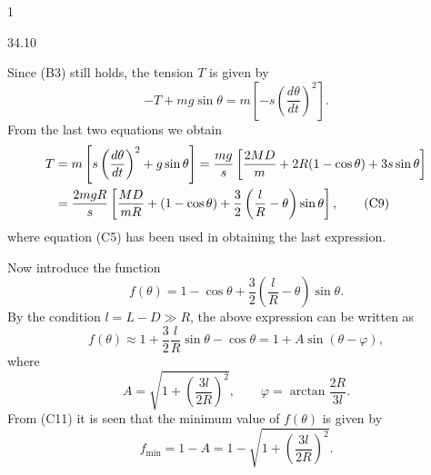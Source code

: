 \begin{solution}{1}
\begin{figbox}{34.10}
\end{figbox}

Since (B3) still holds, the tension $T$ is given by
\begin{equation}
-T+mg\sin\theta=m\left[-s\left(\frac{d\theta}{dt}\right)^2\right]. \tag{C8}
\end{equation}
From the last two equations we obtain
\begin{align}
T&=m\left[s\left(\frac{d\theta}{dt}\right)^2+g\sin\theta\right]
=\frac{mg}{s}\left[\frac{2MD}{m}+2R(1-\cos\theta)+3s\sin\theta\right]\notag\\
&=\frac{2mgR}{s}\left[\frac{MD}{mR}+(1-\cos\theta)+\frac{3}{2}\left(\frac{l}{R}-\theta\right)\sin\theta\right], \tag{C9}
\end{align}
where equation (C5) has been used in obtaining the last expression.

Now introduce the function
\begin{equation}
f(\theta)=1-\cos\theta+\frac{3}{2}\left(\frac{l}{R}-\theta\right)\sin\theta . \tag{C10}
\end{equation}
By the condition $l=L-D\gg R$, the above expression can be written as
\begin{equation}
f(\theta)\approx 1+\frac{3}{2}\frac{l}{R}\sin\theta-\cos\theta=1+A\sin(\theta-\varphi), \tag{C11}
\end{equation}
where
\begin{equation}
A=\sqrt{1+\left(\frac{3l}{2R}\right)^2},\qquad \varphi=\arctan\frac{2R}{3l}. \tag{C12}
\end{equation}
From (C11) it is seen that the minimum value of $f(\theta)$ is given by
\begin{equation}
f_{\min}=1-A=1-\sqrt{1+\left(\frac{3l}{2R}\right)^2}. \tag{C13}
\end{equation}


\end{solution}

